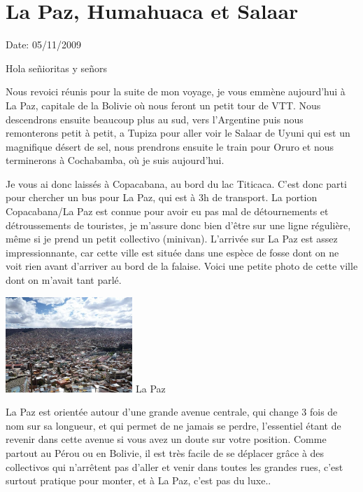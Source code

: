\section{La Paz, Humahuaca et Salaar}

Date: 05/11/2009

\begin{multicols}{2}

Hola señioritas y señors

Nous revoici réunis pour la suite de mon voyage, je vous emmène aujourd'hui à La Paz, capitale de la Bolivie où nous feront un petit tour de VTT. Nous descendrons ensuite beaucoup plus au sud, vers l'Argentine puis nous remonterons petit à petit, a Tupiza pour aller voir le Salaar de Uyuni qui est un magnifique désert de sel, nous prendrons ensuite le train pour Oruro et nous terminerons à Cochabamba, où je suis aujourd'hui.

Je vous ai donc laissés à Copacabana, au bord du lac Titicaca. C'est donc parti pour chercher un bus pour La Paz, qui est à 3h de transport. La portion Copacabana/La Paz est connue pour avoir eu pas mal de détournements et détroussements de touristes, je m'assure donc bien d'être sur une ligne régulière, même si je prend un petit collectivo (minivan). L'arrivée sur La Paz est assez impressionnante, car cette ville est située dans une espèce de fosse dont on ne voit rien avant d'arriver au bord de la falaise. Voici une petite photo de cette ville dont on m'avait tant parlé.

\hspace*{-0.65cm}
\includegraphics[width=4.8cm]{articles/La-paz-humahuaca-et-salaar/1257387232lefu.jpg}
La Paz

La Paz est orientée autour d'une grande avenue centrale, qui change 3 fois de nom sur sa longueur, et qui permet de ne jamais se perdre, l'essentiel étant de revenir dans cette avenue si vous avez un doute sur votre position. Comme partout au Pérou ou en Bolivie, il est très facile de se déplacer grâce à des collectivos qui n'arrêtent pas d'aller et venir dans toutes les grandes rues, c'est surtout pratique pour monter, et à La Paz, c'est pas du luxe..


\end{multicols}
